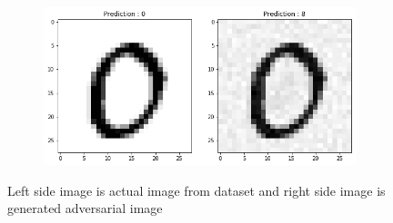 \begin{figure}[htbp]
\begin{subfigure}{.5\textwidth}
                \caption{ }
                \label{fig:sfig3}
            \end{subfigure}
            \begin{subfigure}{.5\textwidth}
                \centering
                \includegraphics[width=\linewidth]{images/adversarial4.png}
                \caption{ }
                \label{fig:sfig4}
            \end{subfigure}
            \caption{Left side image is actual image from dataset and right side image is generated adversarial image}
            \label{fig:generated}
        \end{figure}
